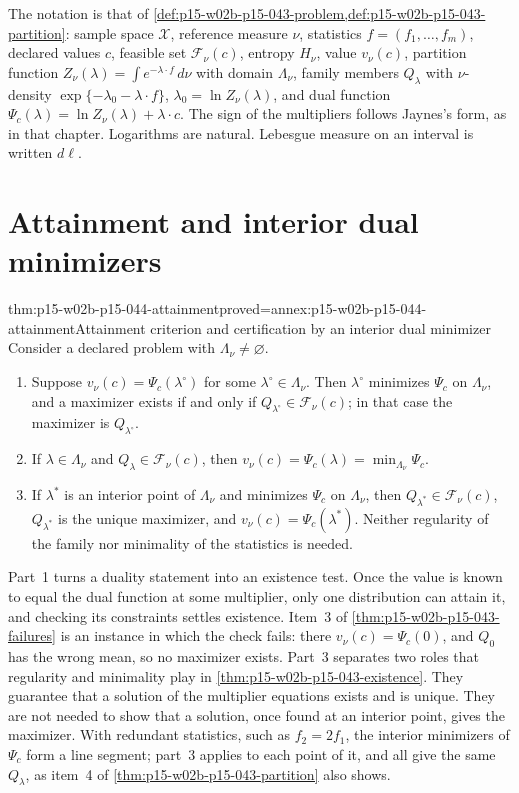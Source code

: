 The notation is that of
\cref{def:p15-w02b-p15-043-problem,def:p15-w02b-p15-043-partition}: sample
space \(\mathcal X\), reference measure \(\nu\), statistics
\(f=(f_1,\dots,f_m)\), declared values \(c\), feasible set
\(\mathcal F_\nu(c)\), entropy \(H_\nu\), value \(v_\nu(c)\), partition
function \(Z_\nu(\lambda)=\int e^{-\lambda\cdot f}\,d\nu\) with domain
\(\Lambda_\nu\), family members \(Q_\lambda\) with
\(\nu\)-density \(\exp\{-\lambda_0-\lambda\cdot f\}\),
\(\lambda_0=\ln Z_\nu(\lambda)\), and dual function
\(\Psi_c(\lambda)=\ln Z_\nu(\lambda)+\lambda\cdot c\). The sign of the
multipliers follows Jaynes's form, as in that chapter. Logarithms are
natural. Lebesgue measure on an interval is written \(d\ell\).

\section{Attainment and interior dual minimizers}
\label{sec:p15-w02b-p15-044-attainment}

\begin{hbtheorem}{thm:p15-w02b-p15-044-attainment}{proved=annex:p15-w02b-p15-044-attainment}{Attainment criterion and certification by an interior dual minimizer}
Consider a declared problem with \(\Lambda_\nu\neq\varnothing\).
\begin{enumerate}
\item Suppose \(v_\nu(c)=\Psi_c(\lambda^\circ)\) for some
\(\lambda^\circ\in\Lambda_\nu\). Then \(\lambda^\circ\) minimizes
\(\Psi_c\) on \(\Lambda_\nu\), and a maximizer exists if and only if
\(Q_{\lambda^\circ}\in\mathcal F_\nu(c)\); in that case the maximizer is
\(Q_{\lambda^\circ}\).
\item If \(\lambda\in\Lambda_\nu\) and \(Q_\lambda\in\mathcal F_\nu(c)\),
then \(v_\nu(c)=\Psi_c(\lambda)=\min_{\Lambda_\nu}\Psi_c\).
\item If \(\lambda^*\) is an interior point of \(\Lambda_\nu\) and
minimizes \(\Psi_c\) on \(\Lambda_\nu\), then
\(Q_{\lambda^*}\in\mathcal F_\nu(c)\), \(Q_{\lambda^*}\) is the unique
maximizer, and \(v_\nu(c)=\Psi_c(\lambda^*)\). Neither regularity of the
family nor minimality of the statistics is needed.
\end{enumerate}
\end{hbtheorem}

Part~1 turns a duality statement into an existence test. Once the value is
known to equal the dual function at some multiplier, only one distribution
can attain it, and checking its constraints settles existence. Item~3 of
\cref{thm:p15-w02b-p15-043-failures} is an instance in which the check
fails: there \(v_\nu(c)=\Psi_c(0)\), and \(Q_0\) has the wrong mean, so no
maximizer exists. Part~3 separates two roles that regularity and
minimality play in \cref{thm:p15-w02b-p15-043-existence}. They guarantee
that a solution of the multiplier equations exists and is unique. They are
not needed to show that a solution, once found at an interior point, gives
the maximizer. With redundant statistics, such as \(f_2=2f_1\), the
interior minimizers of \(\Psi_c\) form a line segment; part~3 applies to
each point of it, and all give the same \(Q_\lambda\), as item~4 of
\cref{thm:p15-w02b-p15-043-partition} also shows.

